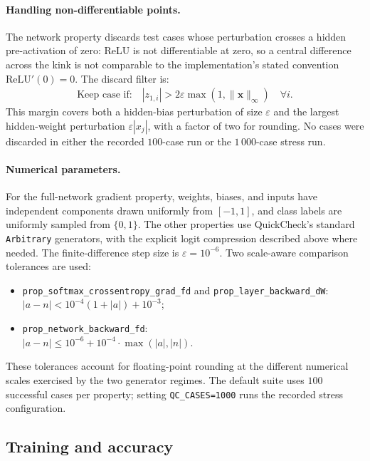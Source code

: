 \documentclass[sigconf,nonacm]{acmart}
\begin{document}
\paragraph{Handling non-differentiable points.}
The network property discards test cases whose perturbation crosses a hidden
pre-activation of zero: ReLU is not differentiable at zero, so a central difference
across the kink is not comparable to the implementation's stated convention
$\mathrm{ReLU}'(0) = 0$. The discard filter is:
\begin{align}
  \text{Keep case if:} \quad
  |z_{1,i}| > 2\varepsilon\max(1,\lVert\mathbf{x}\rVert_\infty)
  \quad \forall i.
\end{align}
This margin covers both a hidden-bias perturbation of size $\varepsilon$ and the
largest hidden-weight perturbation $\varepsilon |x_j|$, with a factor of two for
rounding. No cases were discarded in either the recorded $100$-case run or the
$1\,000$-case stress run.

\paragraph{Numerical parameters.}
For the full-network gradient property, weights, biases, and inputs have
independent components drawn uniformly from $[-1,1]$, and class labels are
uniformly sampled from $\{0,1\}$. The other properties use QuickCheck's standard
\texttt{Arbitrary} generators, with the explicit logit compression described
above where needed. The finite-difference step size is $\varepsilon = 10^{-6}$.
Two scale-aware comparison tolerances are used:
\begin{itemize}
  \item \texttt{prop\_softmax\_crossentropy\_grad\_fd} and
    \texttt{prop\_layer\_backward\_dW}:\\
    $|a - n| < 10^{-4}(1 + |a|) + 10^{-3}$;
  \item \texttt{prop\_network\_backward\_fd}:\\
    $|a - n| \le 10^{-6} + 10^{-4} \cdot \max(|a|, |n|)$.
\end{itemize}
These tolerances account for floating-point rounding at the different numerical
scales exercised by the two generator regimes. The default suite uses $100$
successful cases per property; setting \texttt{QC\_CASES=1000} runs the recorded
stress configuration.

\subsection{Training and accuracy}
\label{sec:res:training}
\end{document}
